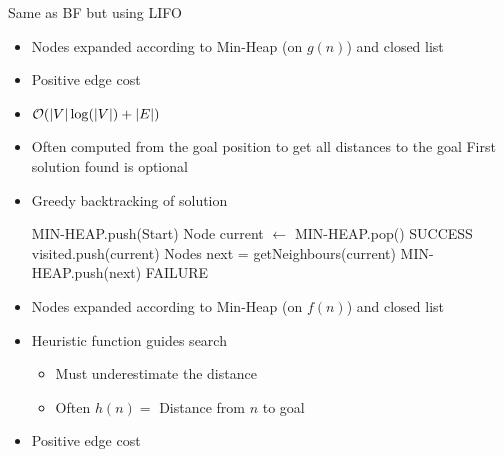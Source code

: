 \begin{itemize}
\begin{itemize}
\begin{itemize}
                     Same as BF but using LIFO
                \end{itemize}
                \begin{itemize}
                    \item Nodes expanded according to Min-Heap (on $g(n)$) and closed list
                    \item Positive edge cost
                    \item $\mathcal{O}(|V| \log(|V|) + |E|)$
                    \item Often computed from the goal position to get all distances to the goal
                    \ipro First solution found is optional
                    \item Greedy backtracking of solution
                        \begin{algorithmic}
                            \STATE MIN-HEAP.push(Start)
                                \STATE Node current $\leftarrow$ MIN-HEAP.pop()
                                    \RETURN SUCCESS
                                \ENDIF
                                \STATE visited.push(current)
                                \STATE Nodes next = getNeighbours(current)
                                    \STATE MIN-HEAP.push(next)
                                \ENDFOR
                            \ENDWHILE
                            \RETURN FAILURE
                        \end{algorithmic}
                \end{itemize}
                \begin{itemize}
                    \item Nodes expanded according to Min-Heap (on $f(n)$) and closed list
                    \item Heuristic function guides search
                        \begin{itemize}
                            \item Must underestimate the distance
                            \item Often $h(n) =$ Distance from $n$ to goal
                        \end{itemize}
                    \item Positive edge cost

\end{itemize}
\end{itemize}
\end{itemize}
